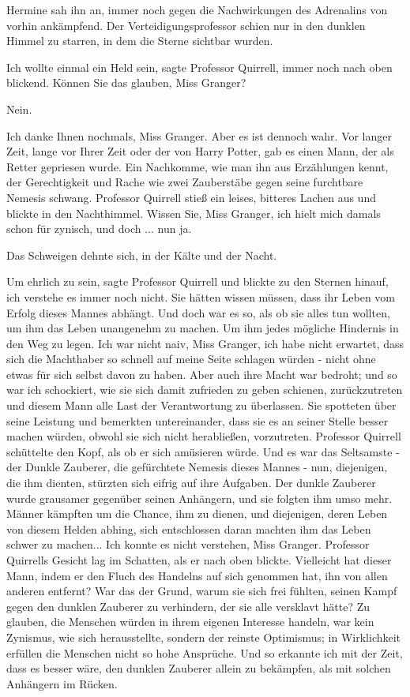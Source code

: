 Hermine sah ihn an, immer noch gegen die Nachwirkungen des Adrenalins von vorhin
ankämpfend. Der Verteidigungsprofessor schien nur in den dunklen Himmel zu
starren, in dem die Sterne sichtbar wurden.

\glqq{}Ich wollte einmal ein Held sein\grqq{}, sagte Professor Quirrell, immer
noch nach oben blickend. \glqq{}Können Sie das glauben, Miss Granger?\grqq{}

\glqq{}Nein.\grqq{}

\glqq{}Ich danke Ihnen nochmals, Miss Granger. Aber es ist dennoch wahr. Vor
langer Zeit, lange vor Ihrer Zeit oder der von Harry Potter, gab es einen Mann,
der als Retter gepriesen wurde. Ein Nachkomme, wie man ihn aus Erzählungen
kennt, der Gerechtigkeit und Rache wie zwei Zauberstäbe gegen seine furchtbare
Nemesis schwang.\grqq{} Professor Quirrell stieß ein leises, bitteres Lachen aus
und blickte in den Nachthimmel. \glqq{}Wissen Sie, Miss Granger, ich hielt mich
damals schon für zynisch, und doch ... nun ja.\grqq{}

Das Schweigen dehnte sich, in der Kälte und der Nacht.

\glqq{}Um ehrlich zu sein\grqq{}, sagte Professor Quirrell und blickte zu den
Sternen hinauf, \glqq{}ich verstehe es immer noch nicht. Sie hätten wissen
müssen, dass ihr Leben vom Erfolg dieses Mannes abhängt. Und doch war es so, als
ob sie alles tun wollten, um ihm das Leben unangenehm zu machen. Um ihm jedes
mögliche Hindernis in den Weg zu legen. Ich war nicht naiv, Miss Granger, ich
habe nicht erwartet, dass sich die Machthaber so schnell auf meine Seite
schlagen würden - nicht ohne etwas für sich selbst davon zu haben. Aber auch
ihre Macht war bedroht; und so war ich schockiert, wie sie sich damit zufrieden
zu geben schienen, zurückzutreten und diesem Mann alle Last der Verantwortung zu
überlassen. Sie spotteten über seine Leistung und bemerkten untereinander, dass
sie es an seiner Stelle besser machen würden, obwohl sie sich nicht herabließen,
vorzutreten.\grqq{} Professor Quirrell schüttelte den Kopf, als ob er sich
amüsieren würde. \glqq{}Und es war das Seltsamste - der Dunkle Zauberer, die
gefürchtete Nemesis dieses Mannes - nun, diejenigen, die ihm dienten, stürzten
sich eifrig auf ihre Aufgaben. Der dunkle Zauberer wurde grausamer gegenüber
seinen Anhängern, und sie folgten ihm umso mehr. Männer kämpften um die Chance,
ihm zu dienen, und diejenigen, deren Leben von diesem Helden abhing, sich
entschlossen daran machten ihm das Leben schwer zu machen... Ich konnte es nicht
verstehen, Miss Granger.\grqq{} Professor Quirrells Gesicht lag im Schatten, als
er nach oben blickte. \glqq{}Vielleicht hat dieser Mann, indem er den Fluch des
Handelns auf sich genommen hat, ihn von allen anderen entfernt? War das der
Grund, warum sie sich frei fühlten, seinen Kampf gegen den dunklen Zauberer zu
verhindern, der sie alle versklavt hätte? Zu glauben, die Menschen würden in
ihrem eigenen Interesse handeln, war kein Zynismus, wie sich herausstellte,
sondern der reinste Optimismus; in Wirklichkeit erfüllen die Menschen nicht so
hohe Ansprüche. Und so erkannte ich mit der Zeit, dass es besser wäre, den
dunklen Zauberer allein zu bekämpfen, als mit solchen Anhängern im
Rücken.\grqq{}

